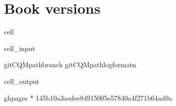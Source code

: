 \documentclass[letterpaper,table,10pt,english]{jupyterBook}
\begin{document}
\section{Book versions}
\label{\detokenize{tests/build_versions_checks:book-versions}}
\begin{sphinxuseclass}{cell}\begin{sphinxVerbatimInput}

\begin{sphinxuseclass}{cell_input}
\begin{sphinxVerbatim}[commandchars=\\\{\}]
  
git\PYGZhy{}CQMpathbranch
git\PYGZhy{}CQMpathlog\PYGZhy{}\PYGZhy{}format\PYGZhy{}n
\end{sphinxVerbatim}

\end{sphinxuseclass}\end{sphinxVerbatimInput}
\begin{sphinxVerbatimOutput}

\begin{sphinxuseclass}{cell_output}
\begin{sphinxVerbatim}[commandchars=\\\{\}]
  gh\PYGZhy{}pages
* 
145b10a3aedee84915005e57840a4f271b64ad0a
\end{sphinxVerbatim}

\end{sphinxuseclass}\end{sphinxVerbatimOutput}

\end{sphinxuseclass}
\end{document}
